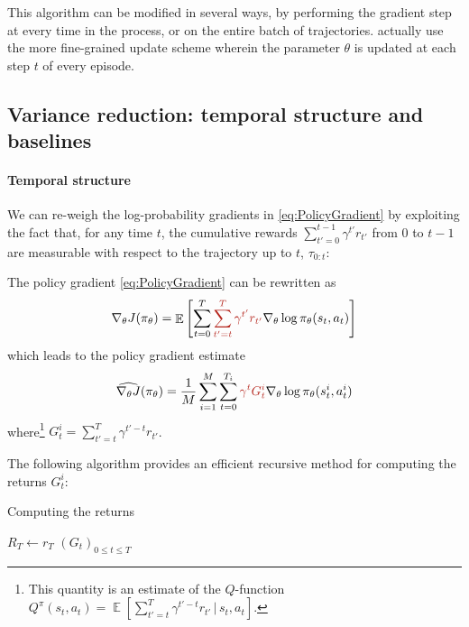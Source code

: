 \documentclass[12pt]{report}
\DeclareMathOperator{\EE}{\mathbb{E}}
\newcommand{\redfont}{\color{darkred}}
\begin{document}
This algorithm can be modified in several ways, by performing the gradient step at every time in the process, or on the entire batch of trajectories. \textcite{Sutton1998} actually use the more fine-grained update scheme wherein the parameter $\theta$ is updated at each step $t$ of every episode.

\subsection{Variance reduction: temporal structure and baselines}

\paragraph{Temporal structure} We can re-weigh the log-probability gradients in \cref{eq:PolicyGradient} by exploiting the fact that, for any time $t$, the cumulative rewards $\sum_{t'=0}^{t-1} \gamma^{t'} r_{t'}$ from $0$ to $t-1$ are measurable with respect to the trajectory up to $t$, $\tau_{0:t}$:
\begin{prop}
The policy gradient \eqref{eq:PolicyGradient} can be rewritten as
\begin{equation}
\nabla_\theta J(\pi_\theta) =
\EE\left[
	\sum_{t=0}^T
	{\redfont
		\sum_{t'=t}^T \gamma^{t'} r_{t'}
	}
	\nabla_\theta \log\pi_\theta(s_t,a_t)
\right]
\end{equation}
which leads to the policy gradient estimate
\begin{equation}
	\widehat{\nabla_\theta J}(\pi_\theta) =
	\frac{1}{M}\sum_{i=1}^M
	\sum_{t=0}^{T_i}
	{\redfont \gamma^t G^i_t}
	\nabla_\theta \log\pi_\theta (s_t^i, a_t^i)
\end{equation}
where\footnote{This quantity is an estimate of the $Q$-function $Q^\pi(s_t, a_t) = \EE [\sum_{t'=t}^T \gamma^{t'-t} r_{t'} \,|\, s_{t}, a_{t} ]$.} $G^i_t = \sum_{t'=t}^T \gamma^{t'-t}r_{t'}$.
\end{prop}


The following algorithm provides an efficient recursive method for computing the returns $G^i_t$:

\begin{algorithm}
	\caption{Computing the returns}\label{algo:ComputeReturnsEfficient}
	$R_T \leftarrow r_T$\;
	\Return $(G_t)_{0\leq t\leq T}$\;
\end{algorithm}
\end{document}
